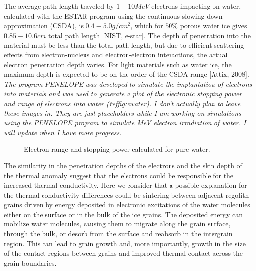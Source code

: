 \documentclass[11pt]{article} %
\begin{document}
	The average path length traveled by $1 - 10 MeV$ electrons impacting on water, calculated with the ESTAR program using the continuous-slowing-down-approximation (CSDA), is $0.4-5.0 g/cm^{2}$, which for $50\%$ porous water ice gives $0.85-10.6 cm$ total path length [NIST, e-star]. The depth of penetration into the material must be less than the total path length, but due to efficient scattering effects from electron-nucleus and electron-electron interactions, the actual electron penetration depth varies. For light materials such as water ice, the maximum depth is expected to be on the order of the CSDA range [Attix, 2008]. \emph{The program PENELOPE was developed to simulate the implantation of electrons into materials and was used to generate a plot of the electronic stopping power and range of electrons into water (\~ref{fig:ewater}). I don't actually plan to leave these images in. They are just placeholders while I am working on simulations using the PENELOPE program to simulate MeV electron irradiation of water. I will update when I have more progress.}
	
	\begin{figure}[h]
	\centering
	\caption{Electron range and stopping power calculated for pure water.}
	\label{fig:ewater}
	\end{figure}
	
	The similarity in the penetration depths of the electrons and the skin depth of the thermal anomaly suggest that the electrons could be responsible for the increased thermal conductivity.  Here we consider that a possible explanation for the thermal conductivity differences could be sintering between adjacent regolith grains driven by energy deposited in electronic excitations of the water molecules either on the surface or in the bulk of the ice grains. The deposited energy can mobilize water molecules, causing them to migrate along the grain surface, through the bulk, or desorb from the surface and reabsorb in the intergrain region. This can lead to grain growth and, more importantly, growth in the size of the contact regions between grains and improved thermal contact  across the grain boundaries.
	
\end{document}
